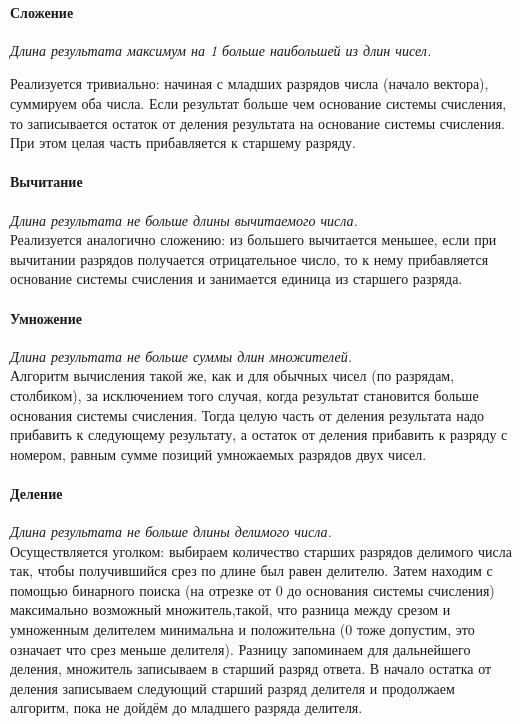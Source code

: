 \documentclass[12pt]{article}
\begin{document}
\paragraph{Сложение}{\it Длина результата максимум на 1 больше наибольшей из длин чисел.}


Реализуется тривиально: начиная с младших разрядов числа (начало вектора), суммируем оба числа. Если результат больше чем основание системы счисления, то записывается остаток от деления результата на основание системы счисления. При этом целая часть прибавляется к старшему разряду.

\paragraph{Вычитание}{\it Длина результата не больше длины вычитаемого числа.}\\
Реализуется аналогично сложению: из большего вычитается меньшее, если при вычитании разрядов получается отрицательное число, то к нему прибавляется основание системы счисления и занимается единица из старшего разряда.

\paragraph{Умножение} {\it Длина результата не больше суммы длин множителей.}\\
Алгоритм вычисления такой же, как и для обычных чисел (по разрядам, столбиком), за исключением того случая, когда результат становится больше основания системы счисления. Тогда целую часть от деления результата надо прибавить к следующему результату, а остаток от деления прибавить к разряду с номером, равным сумме позиций умножаемых разрядов двух чисел.

\paragraph{Деление}{\it  Длина результата не больше длины делимого числа.}\\
Осуществляется уголком: выбираем количество старших разрядов делимого числа так, чтобы получившийся срез по длине был равен делителю. Затем находим с помощью бинарного поиска (на отрезке от 0 до основания системы счисления) максимально возможный множитель,такой, что разница между срезом и умноженным делителем минимальна и положительна (0 тоже допустим, это означает что срез меньше делителя). Разницу запоминаем для дальнейшего деления, множитель записываем в старший разряд ответа. В начало остатка от деления записываем следующий старший разряд делителя и продолжаем алгоритм, пока не дойдём до младшего разряда делителя.
\end{document}
